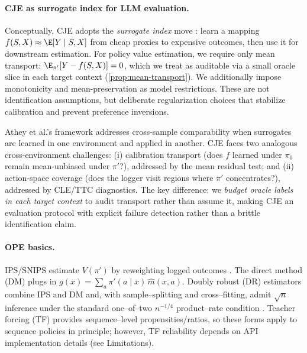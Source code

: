 \paragraph{CJE as surrogate index for LLM evaluation.}
Conceptually, CJE adopts the \emph{surrogate index} move \citep{AtheyChettyImbensKang2019}: learn a mapping $f(S,X) \approx \E[Y \mid S, X]$ from cheap proxies to expensive outcomes, then use it for downstream estimation. For policy value estimation, we require only mean transport: $\E_{\pi'}[Y - f(S,X)] = 0$, which we treat as auditable via a small oracle slice in each target context (\cref{prop:mean-transport}). We additionally impose monotonicity and mean-preservation as model restrictions. These are not identification assumptions, but deliberate regularization choices that stabilize calibration and prevent preference inversions.

Athey et al.'s framework addresses cross-sample comparability when surrogates are learned in one environment and applied in another. CJE faces two analogous cross-environment challenges: (i) calibration transport (does $f$ learned under $\pi_0$ remain mean-unbiased under $\pi'$?), addressed by the mean residual test; and (ii) action-space coverage (does the logger visit regions where $\pi'$ concentrates?), addressed by CLE/TTC diagnostics. The key difference: we \emph{budget oracle labels in each target context} to audit transport rather than assume it, making CJE an evaluation protocol with explicit failure detection rather than a brittle identification claim.

\paragraph{OPE basics.}
IPS/SNIPS estimate $V(\pi')$ by reweighting logged outcomes
\citep{HorvitzThompson1952,Hajek1964Rejective,LiChuLangfordSchapire2011,SwaminathanJoachims2015CRM}.
The direct method (DM) plugs in $g(x)=\sum_{a}\pi'(a\mid x)\,\hat m(x,a)$. Doubly robust (DR)
estimators combine IPS and DM \citep{BangRobins2005} and, with sample–splitting and cross–fitting, admit $\sqrt{n}$
inference under the standard one–of–two $n^{-1/4}$ product–rate condition
\citep{Bickel1993,VaartWellner2000,Kosorok2008,JiangLi2016,Chernozhukov2018,vanDerLaanRose2011TL, KallusUehara2020DRL}.
Teacher forcing (TF) provides sequence–level propensities/ratios, so these forms apply to sequence policies in principle; however, TF reliability depends on API implementation details (see Limitations).

